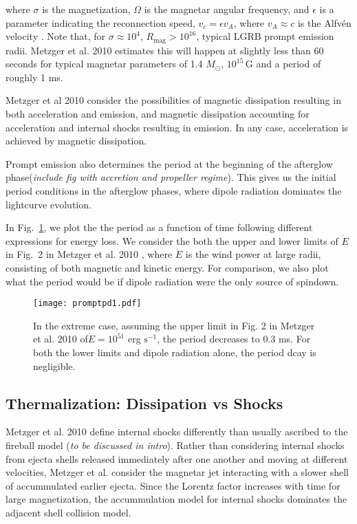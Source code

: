 \documentclass{article}
\begin{document}
where $\sigma$ is the magnetization, $\Omega$ is the magnetar angular frequency, and $\epsilon$ is a parameter indicating the reconnection speed, $v_c=\epsilon v_A$, where $v_A \approx c$ is the Alfv\'en velocity \cite{Metzger:2010pp}. Note that, for $\sigma\approx 10^4$, $R_{\mathrm{mag}} >10^{16}$, typical LGRB prompt emission radii. Metzger et al. 2010 estimates this will happen at slightly less than 60 seconds for typical magnetar parameters of 1.4 $M_{\odot}$, $10^{15}$\,G and a period of roughly 1 ms.

Metzger et al 2010 consider the possibilities of magnetic dissipation resulting in both acceleration and emission, and magnetic dissipation accounting for acceleration and internal shocks resulting in emission. In any case, acceleration is achieved by magnetic dissipation.

Prompt emission also determines the period at the beginning of the afterglow phase(\textit{include fig with accretion and propeller regime}). This gives us the initial period conditions in the afterglow phases, where dipole radiation dominates the lightcurve evolution. 

In Fig.~\ref{fig:7}, we plot the the period as a function of time following different expressions for energy loss. We consider the both the upper and lower limits of $\dot{E}$ in Fig.~2 in Metzger et al. 2010 \cite{Metzger:2010pp}, where $\dot{E}$ is the wind power at large radii, consisting of both magnetic and kinetic energy. For comparison, we also plot what the period would be if dipole radiation were the only source of spindown.

\begin{figure}[h!]
\centering
\texttt{[image: promptpd1.pdf]}
\caption{In the extreme case, assuming the upper limit in Fig. 2 in Metzger et al. 2010 of$\dot{E}=10^{51}$ erg $\mathrm{s}^{-1}$, the period decreases to 0.3 ms. For both the lower limits and dipole radiation alone, the period dcay is negligible.}
\label{fig:7}
\end{figure}

\subsection{Thermalization: Dissipation vs Shocks}
Metzger et al. 2010 define internal shocks differently than usually ascribed to the fireball model (\textit{to be discussed in intro}). Rather than considering internal shocks from ejecta shells released immediately after one another and moving at different velocities, Metzger et al. consider the magnetar jet interacting with a slower shell of accummulated earlier ejecta. Since the Lorentz factor increases with time for large magnetization, the accummulation model for internal shocks dominates the adjacent shell collision model.
\end{document}
